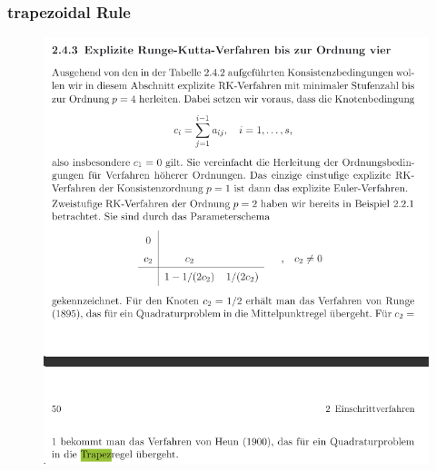 	\subsubsection{trapezoidal Rule}
	\begin{figure}[H]
		\centering
		\includegraphics[width=0.7\linewidth]{screenshot019}
		\caption{}
		\label{fig:screenshot019}
	\end{figure}
	
		
		
	
	
	